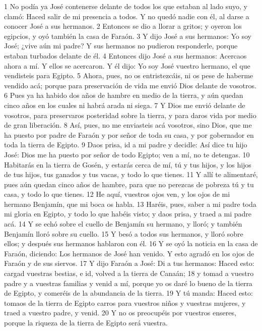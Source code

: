 1 No podía ya José contenerse delante de todos los que estaban al lado suyo, y clamó: Haced salir de mi presencia a todos. Y no quedó nadie con él, al darse a conocer José a sus hermanos.
2 Entonces se dio a llorar a gritos; y oyeron los egipcios, y oyó también la casa de Faraón.
3 Y dijo José a sus hermanos: Yo soy José; ¿vive aún mi padre? Y sus hermanos no pudieron responderle, porque estaban turbados delante de él.
4 Entonces dijo José a sus hermanos: Acercaos ahora a mí. Y ellos se acercaron. Y él dijo: Yo soy José vuestro hermano, el que vendisteis para Egipto.
5 Ahora, pues, no os entristezcáis, ni os pese de haberme vendido acá; porque para preservación de vida me envió Dios delante de vosotros.
6 Pues ya ha habido dos años de hambre en medio de la tierra, y aún quedan cinco años en los cuales ni habrá arada ni siega.
7 Y Dios me envió delante de vosotros, para preservaros posteridad sobre la tierra, y para daros vida por medio de gran liberación.
8 Así, pues, no me enviasteis acá vosotros, sino Dios, que me ha puesto por padre de Faraón y por señor de toda su casa, y por gobernador en toda la tierra de Egipto.
9 Daos prisa, id a mi padre y decidle: Así dice tu hijo José: Dios me ha puesto por señor de todo Egipto; ven a mí, no te detengas.
10 Habitarás en la tierra de Gosén, y estarás cerca de mí, tú y tus hijos, y los hijos de tus hijos, tus ganados y tus vacas, y todo lo que tienes.
11 Y allí te alimentaré, pues aún quedan cinco años de hambre, para que no perezcas de pobreza tú y tu casa, y todo lo que tienes.
12 He aquí, vuestros ojos ven, y los ojos de mi hermano Benjamín, que mi boca os habla.
13 Haréis, pues, saber a mi padre toda mi gloria en Egipto, y todo lo que habéis visto; y daos prisa, y traed a mi padre acá.
14 Y se echó sobre el cuello de Benjamín su hermano, y lloró; y también Benjamín lloró sobre su cuello.
15 Y besó a todos sus hermanos, y lloró sobre ellos; y después sus hermanos hablaron con él.
16 Y se oyó la noticia en la casa de Faraón, diciendo: Los hermanos de José han venido. Y esto agradó en los ojos de Faraón y de sus siervos.
17 Y dijo Faraón a José: Di a tus hermanos: Haced esto: cargad vuestras bestias, e id, volved a la tierra de Canaán;
18 y tomad a vuestro padre y a vuestras familias y venid a mí, porque yo os daré lo bueno de la tierra de Egipto, y comeréis de la abundancia de la tierra.
19 Y tú manda: Haced esto: tomaos de la tierra de Egipto carros para vuestros niños y vuestras mujeres, y traed a vuestro padre, y venid.
20 Y no os preocupéis por vuestros enseres, porque la riqueza de la tierra de Egipto será vuestra.
